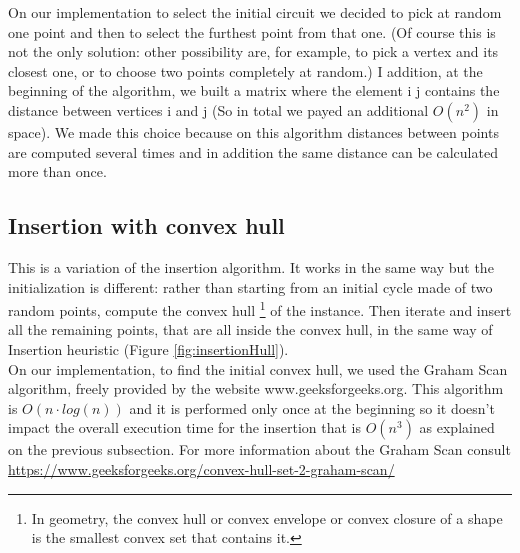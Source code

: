 \noindent On our implementation to select the initial circuit we decided to pick at random one point and then to select the furthest point from that one. (Of course this is not the only solution: other possibility are, for example, to pick a vertex and its closest one, or to choose two points completely at random.) I addition, at the beginning of the algorithm, we built a matrix where the element i j contains the distance between vertices i and j (So in total we payed an additional $O(n^2)$ in space). We made this choice because on this algorithm distances between points are computed several times and in addition the same distance can be calculated more than once.\\


\subsection{Insertion with convex hull}
This is a variation of the insertion algorithm. It works in the same way but the initialization is different: rather than starting from an initial cycle made of two random points, compute the convex hull \footnote{In geometry, the convex hull or convex envelope or convex closure of a shape is the smallest convex set that contains it. %
} of the instance. Then iterate and insert all the remaining points, that are all inside the convex hull, in the same way of Insertion heuristic (Figure \ref{fig:insertionHull}).\\
On our implementation, to find the initial convex hull, we used the Graham Scan algorithm, freely provided by the website www.geeksforgeeks.org. This algorithm is $O(n \cdot log(n))$ and it is performed only once at the beginning so it doesn't impact the overall execution time for the insertion that is $O(n^3)$ as explained on the previous subsection. For more information about the Graham Scan consult \url{https://www.geeksforgeeks.org/convex-hull-set-2-graham-scan/}

